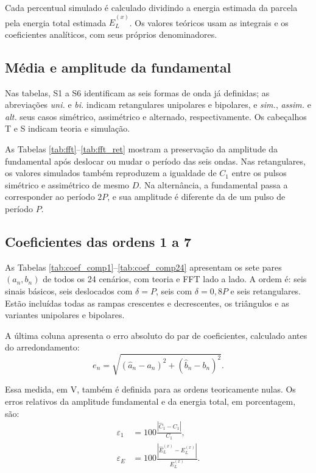 Cada percentual simulado é calculado dividindo a energia estimada
da parcela pela energia total estimada $\widehat E_L^{(x)}$.
Os valores teóricos usam as integrais e os coeficientes analíticos,
com seus próprios denominadores.

\subsection{Média e amplitude da fundamental}

Nas tabelas, S1 a S6 identificam as seis formas de onda já definidas;
as abreviações \textit{uni.} e \textit{bi.} indicam retangulares
unipolares e bipolares, e \textit{sim.}, \textit{assim.} e \textit{alt.}
seus casos simétrico, assimétrico e alternado, respectivamente.
Os cabeçalhos T e S indicam teoria e simulação.



As Tabelas \ref{tab:fft}--\ref{tab:fft_ret} mostram a preservação
da amplitude da fundamental após deslocar ou mudar o período das
seis ondas. Nas retangulares, os valores simulados também reproduzem
a igualdade de $C_1$ entre os pulsos simétrico e assimétrico de mesmo
$D$. Na alternância, a fundamental passa a corresponder ao período
$2P$, e sua amplitude é diferente da de um pulso de período $P$.

\subsection{Coeficientes das ordens 1 a 7}
As Tabelas \ref{tab:coef_comp1}--\ref{tab:coef_comp24} apresentam
os sete pares $(a_n,b_n)$ de todos os 24 cenários, com teoria e
FFT lado a lado. A ordem é: seis sinais básicos, seis deslocados
com $\delta=P$, seis com $\delta=0{,}8P$ e seis retangulares.
Estão incluídas todas as rampas crescentes e decrescentes,
os triângulos e as variantes unipolares e bipolares.

A última coluna apresenta o erro absoluto do par de coeficientes,
calculado antes do arredondamento:
\begin{equation}
    e_n=\sqrt{(\widehat a_n-a_n)^2+(\widehat b_n-b_n)^2}.
    \label{eq:erro_coeficientes}
\end{equation}

Essa medida, em V, também é definida para as ordens teoricamente
nulas. Os erros relativos da amplitude fundamental e da energia
total, em porcentagem, são:
\begin{equation}
    \begin{aligned}
        \varepsilon_1&=100\frac{|\widehat C_1-C_1|}{C_1}, \\
        \varepsilon_E&=100\frac{|\widehat E_L^{(x)}-E_L^{(x)}|}{E_L^{(x)}}.
    \end{aligned}
\end{equation}

